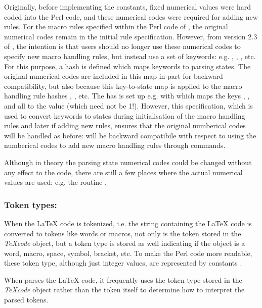 \documentclass{article}
\newcommand\Obj[1]{\textsl{#1}}
\newcommand\wild{\ldots}
\begin{document}
Originally, before implementing the \code{\$STATE_\wild} constants, fixed numerical values were hard coded into the Perl code, and these numerical codes were required for adding new rules. For the macro rules specified within the Perl code of \TeXcount{}, the original numerical codes remain in the initial rule specification. However, from version 2.3 of \TeXcount{}, the intention is that users should no longer use these numerical codes to specify new macro handling rules, but instead use a set of keywords: e.g. , , , etc. For this purpose, a hash  is defined which maps keywords to parsing states. The original numerical codes are included in this map in part for backward compatibility, but also because this key-to-state map is applied to the macro handling rule hashes , , etc. The  has is set up e.g. with
which maps the keys , ,  and  all to the value  (which need not be 1!). However, this specification, which is used to convert keywords to states during initialisation of the macro handling rules and later if adding new rules, ensures that the original numberical codes will be handled as before: \TeXcount{} will be backward compatibile with respect to using the numberical codes to add new macro handling rules through  commands. 

Although in theory the parsing state numerical codes could be changed without any effect to the code, there are still a few places where the actual numerical values are used: e.g. the routine .

\subsubsection{Token types: \code{\$TOKEN_\wild}}

When the \LaTeX{} code is tokenized, i.e. the string containing the \LaTeX{} code is converted to tokens like words or macros, not only is the token stored in the \Obj{TeXcode} object, but a token type is stored as well indicating if the object is a word, macro, space, symbol, bracket, etc. To make the Perl code more readable, these token type, although just integer values, are represented by constants \code{\$TOKEN_\wild}.

When  parses the \LaTeX{} code, it frequently uses the token type stored in the \Obj{TeXcode} object rather than the token itself to determine how to interpret the parsed tokens.
\end{document}
